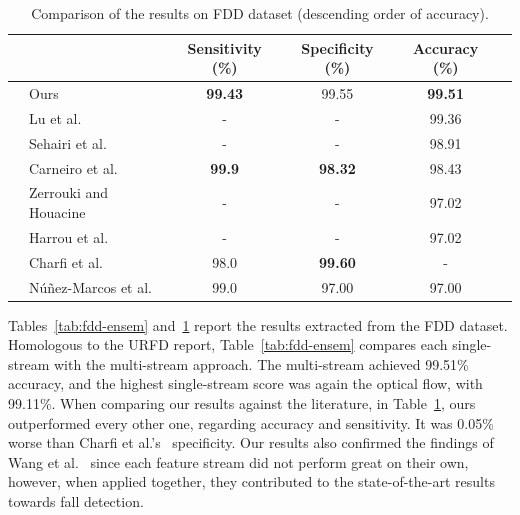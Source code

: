 \documentclass[10pt, conference, compsocconf]{IEEEtran}
\begin{document}
\begin{table}[!htb]
\centering
\caption{Comparison of the results on FDD dataset (descending order of accuracy).}
\label{tab:fdd-our-their}
\begin{tabular}{llcccl}
\hline
 &                                                      & Sensitivity (\%)  & Specificity (\%)  & Accuracy (\%)     & \\ \hline
 & Ours                                                 & \textbf{99.43}    & 99.55             & \textbf{99.51}    & \\
 & Lu et al.~\cite{lu2018deep}                          & -                 & -                 & 99.36             & \\
 & Sehairi et al.~\cite{sehairi2018elderly}             & -                 & -                 & 98.91             & \\
 & Carneiro et al.~\cite{carneiro2019multi}                                                 & \textbf{99.9}      & \textbf{98.32}    & 98.43             & \\
 & Zerrouki and Houacine~\cite{zerrouki2018combined}    & -                 & -                 & 97.02             & \\
 & Harrou et al.~\cite{harrou2017vision}                & -                 & -                 & 97.02             & \\
 & Charfi et al.~\cite{charfi2012definition}            & 98.0              & \textbf{99.60}    & -                 & \\
 & N\'u\~nez-Marcos et al.~\cite{nunez2017vision}       & 99.0              & 97.00             & 97.00             & \\ \hline
\end{tabular}
\end{table}

Tables~\ref{tab:fdd-ensem} and~\ref{tab:fdd-our-their} report the results extracted from the FDD dataset. Homologous to the URFD report, Table~\ref{tab:fdd-ensem} compares each single-stream with the multi-stream approach. The multi-stream achieved 99.51\% accuracy, and the highest single-stream score was again the optical flow, with 99.11\%. When comparing our results against the literature, in Table~\ref{tab:fdd-our-their}, ours outperformed every other one, regarding accuracy and sensitivity. It was 0.05\% worse than Charfi et al.'s~\cite{charfi2013optimised} specificity. Our results also confirmed the findings of Wang et al.~\cite{wang2015towards} since each feature stream did not perform great on their own, however, when applied together, they contributed to the state-of-the-art results towards fall detection.
 
\end{document}
